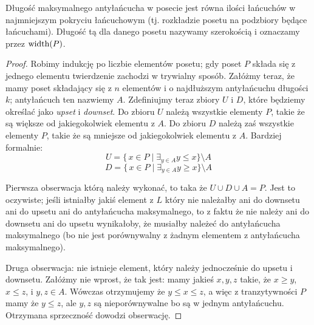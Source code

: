 \begin{theorem}
	Długość maksymalnego antyłańcucha w posecie jest równa ilości łańcuchów w najmniejszym pokryciu łańcuchowym
	(tj. rozkładzie posetu na podzbiory będące łańcuchami). Długość tą dla danego posetu nazywamy szerokością i oznaczamy
	przez $\text{width}(P)$.
\end{theorem}

\begin{proof}
	Robimy indukcję po liczbie elementów posetu; gdy poset $P$ składa się z jednego elementu twierdzenie zachodzi w trywialny sposób. Załóżmy teraz, że mamy poset składający się z $n$ elementów i o najdłuższym antyłańcuchu długości $k$; antyłańcuch ten nazwiemy $A$. Zdefiniujmy teraz zbiory $U$ i $D$, które będziemy określać jako \textit{upset} i \textit{downset}. Do zbioru $U$ należą wszystkie elementy $P$, takie że są większe od jakiegokolwiek elementu z $A$. Do zbioru $D$ należą zaś wszystkie elementy $P$, takie że są mniejsze od jakiegokolwiek elementu z $A$. Bardziej formalnie:
	\begin{equation*}
		U = \{\,x \in P \mid \exists_{y \in A}  y \leq x \} \setminus A
	\end{equation*}
	\begin{equation*}
		D = \{\,x \in P \mid \exists_{y \in A} y \geq x \} \setminus A
	\end{equation*}

	Pierwsza obserwacja którą należy wykonać, to taka że $U \cup D \cup A = P$. Jest to oczywiste; jeśli istniałby jakiś element z $L$ który nie należałby ani do downsetu ani do upsetu ani do antyłańcucha maksymalnego, to z faktu że nie należy ani do downsetu ani do upsetu wynikałoby, że musiałby należeć do antyłańcucha maksymalnego (bo nie jest porównywalny z żadnym elementem z antyłańcucha maksymalnego).

	Druga obserwacja: nie istnieje element, który należy jednocześnie do upsetu i downsetu. Załóżmy nie wprost, że tak jest: mamy jakieś $x, y, z$ takie, że $x \geq y$,  $x \leq z$, i $y,z \in A$. Wówczas otrzymujemy że $y \leq x \leq z$, a więc z tranzytywności $P$ mamy że $y \leq z$, ale $y, z$ są nieporównywalne bo są w jednym antyłańcuchu. Otrzymana sprzeczność dowodzi obserwację.


\end{proof}
